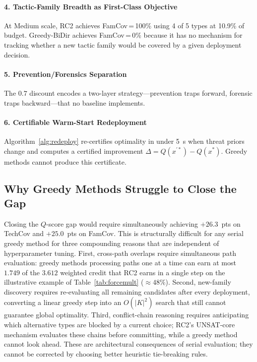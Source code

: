 \documentclass[journal]{IEEEtran}
\newcommand{\qscore}{$Q$-score}
\begin{document}
\paragraph{4. Tactic-Family Breadth as First-Class Objective}
At Medium scale, RC2 achieves FamCov\,=\,100\% using 4 of 5 types
at 10.9\% of budget. Greedy-BiDir achieves FamCov\,=\,0\% because
it has no mechanism for tracking whether a new tactic family would
be covered by a given deployment decision.

\paragraph{5. Prevention/Forensics Separation}
The $0.7$ discount encodes a two-layer strategy---prevention traps
forward, forensic traps backward---that no baseline implements.

\paragraph{6. Certifiable Warm-Start Redeployment}
Algorithm~\ref{alg:redeploy} re-certifies optimality in under 5~s
when threat priors change and computes a certified improvement
$\Delta=Q(x^{\prime*})-Q(x^*)$. Greedy methods cannot produce this
certificate.

\subsection{Why Greedy Methods Struggle to Close the Gap}
Closing the \qscore{} gap would require simultaneously achieving
$+26.3$~pts on TechCov and $+25.0$~pts on FamCov. This is
structurally difficult for any serial greedy method for three
compounding reasons that are independent of hyperparameter tuning.
First, cross-path overlaps require simultaneous path evaluation:
greedy methods processing paths one at a time can earn at most
$1.749$ of the $3.612$ weighted credit that RC2 earns in a single
step on the illustrative example of Table~\ref{tab:forcemult}
(${\approx}48\%$). Second, new-family discovery requires
re-evaluating all remaining candidates after every deployment,
converting a linear greedy step into an $O(|K|^2)$ search that still
cannot guarantee global optimality. Third, conflict-chain reasoning
requires anticipating which alternative types are blocked by a
current choice; RC2's UNSAT-core mechanism evaluates these chains
before committing, while a greedy method cannot look ahead.
These are architectural consequences of serial evaluation; they
cannot be corrected by choosing better heuristic tie-breaking rules.
\end{document}
